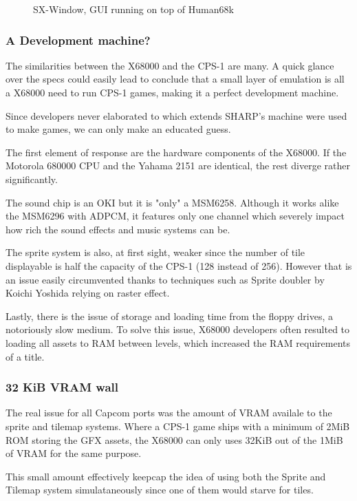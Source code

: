 \begin{figure}[H]
\caption*{SX-Window, GUI running on top of Human68k}
\end{figure}



\subsubsection{A Development machine?}
The similarities between the X68000 and the CPS-1 are many. A quick glance over the specs could easily lead to conclude that a small layer of emulation is all a X68000 need to run CPS-1 games, making it a perfect development machine.

Since developers never elaborated to which extends SHARP's machine were used to make games, we can only make an educated guess.

The first element of response are the hardware components of the X68000. If the Motorola 680000 CPU and the Yahama 2151 are identical, the rest diverge rather significantly.

The sound chip is an OKI but it is "only" a MSM6258. Although it works alike the MSM6296 with ADPCM, it features only one channel which severely impact how rich the sound effects and music systems can be.

The sprite system is also, at first sight, weaker since the number of tile displayable is half the capacity of the CPS-1 (128 instead of 256). However that is an issue easily circumvented thanks to techniques such as Sprite doubler by Koichi Yoshida\cite{x68000spritedoubler} relying on raster effect.

Lastly, there is the issue of storage and loading time from the floppy drives, a notoriously slow medium. To solve this issue, X68000 developers often resulted to loading all assets to RAM between levels, which increased the RAM requirements of a title.

\subsubsection{32 KiB VRAM wall}

The real issue for all Capcom ports was the amount of VRAM availale to the sprite and tilemap systems. Where a CPS-1 game ships with a minimum of 2MiB ROM storing the GFX assets, the X68000 can only uses 32KiB out of the 1MiB of VRAM for the same purpose. 

This small amount effectively keepcap the idea of using both the Sprite and Tilemap system simulataneously since one of them would starve for tiles. 

